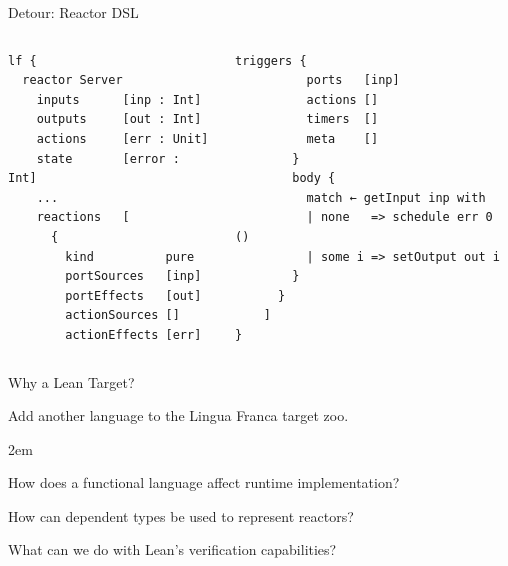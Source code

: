 \documentclass[aspectratio=169]{beamer}
\begin{document}

\begin{frame}[fragile]{Detour: Reactor DSL}
\begin{columns}[t]

\begin{column}{0.5\textwidth}
\begin{lstlisting}[basicstyle=\small]
lf {
  reactor Server
    inputs      [inp : Int]
    outputs     [out : Int]
    actions     [err : Unit]
    state       [error : Int]
    ...
    reactions   [
      {
        kind          pure
        portSources   [inp]
        portEffects   [out]
        actionSources []
        actionEffects [err]
\end{lstlisting}
\end{column}

\begin{column}{0.5\textwidth}
\begin{lstlisting}[basicstyle=\small]
        triggers {
          ports   [inp]
          actions []
          timers  []
          meta    []
        }
        body {
          match ← getInput inp with
          | none   => schedule err 0 ()
          | some i => setOutput out i
        }
      }
    ]
}
\end{lstlisting}
\end{column}

\end{columns}
\end{frame}


\begin{frame}{Why a Lean Target?}
\begin{enumerate}
{ \item Add another language to the Lingua Franca target zoo.}
\itemsep2em 
\item How does a functional language affect runtime implementation?
{ 
\item How can dependent types be used to represent reactors?
\item What can we do with Lean's verification capabilities?
}
\end{enumerate}
\end{frame}

\end{document}
